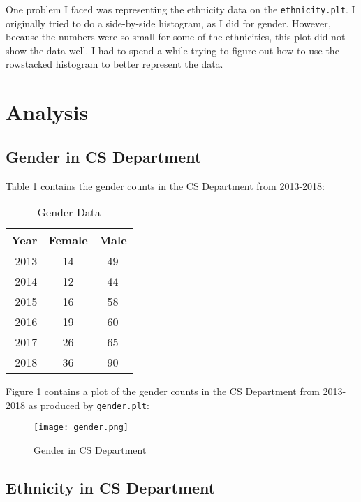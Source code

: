 \documentclass[letterpaper]{article}
\begin{document}
One problem I faced was representing the ethnicity data on the {\tt ethnicity.plt}. I originally tried to do a side-by-side histogram, as I did for gender. However, because the numbers were so small for some of the ethnicities, this plot did not show the data well. I had to spend a while trying to figure out how to use the rowstacked histogram to better represent the data.


\newpage
\section*{Analysis}

\subsection*{Gender in CS Department}

Table 1 contains the gender counts in the CS Department from 2013-2018: \par

\begin{table}[h!]
    \centering
    \begin{tabular}{r||c|c}
    Year	& Female & Male\\
    \hline
    2013	& 14 & 49\\
    2014	& 12 & 44\\
    2015	& 16 & 58\\
    2016	& 19 & 60\\
    2017	& 26 & 65\\
    2018	& 36 & 90\\
    \end{tabular}
    \caption{Gender Data}
    \label{tbl:gender}
\end{table}
\bigskip
Figure 1 contains a plot of the gender counts in the CS Department from 2013-2018 as produced by {\tt gender.plt}:
\smallskip
\begin{figure}[h!]
	\centering
	\caption{Gender in CS Department}
	\texttt{[image: gender.png]}
	\label{fig:results}
\end{figure}

\bigskip
\newpage

\subsection*{Ethnicity in CS Department}
\end{document}
